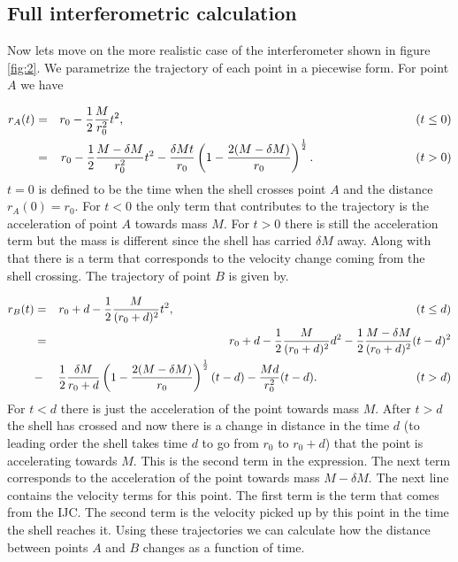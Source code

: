 \documentclass[aps,showpacs,onecolumn,floats,prd,superscriptaddress,nofootinbib]{revtex4-1}
\begin{document}
\subsection{Full interferometric calculation}

Now lets move on the more realistic case of the interferometer shown in figure \ref{fig:2}. We parametrize the trajectory of each point in a piecewise form. For point $A$ we have

\begin{eqnarray}
	r_A(t)  & = & r_0 - \frac{1}{2} \frac{M}{r_0^2} t^2, \hspace{85mm} (t \leq 0)	\nonumber	\\
	&  = & r_0 - \frac{1}{2} \frac{M-\delta M}{r_0^2} t^2 - \frac{\delta M t}{r_0} \left( 1 - \frac{2(M -\delta M)}{r_0} \right)^\frac{1}{2}. \hspace{30mm} (t>0)	\label{rA}
\end{eqnarray}
$t=0$ is defined to be the time when the shell crosses point $A$ and the distance $r_A(0) = r_0$. For $t<0$ the only term that contributes to the trajectory is the acceleration of point $A$ towards mass $M$. For $t>0$ there is still the acceleration term but the mass is different since the shell has carried $\delta M$ away. Along with that there is a term that corresponds to the velocity change coming from the shell crossing. The trajectory of point $B$ is given by.

\begin{eqnarray}
	r_B(t) & = & r_0 + d - \frac{1}{2}\frac{M}{(r_0+d)^2} t^2,  \hspace{73mm}	(t \leq d) \nonumber	\\
	& = & r_0 +d - \frac{1}{2} \frac{M}{(r_0 + d)^2}d^2 - \frac{1}{2} \frac{M - \delta M}{(r_0 +d)^2}(t - d)^2 \nonumber	\\
	& - & \frac{1}{2} \frac{\delta M}{r_0 + d}  \left( 1 - \frac{2(M -\delta M)}{r_0} \right)^\frac{1}{2} (t-d) - \frac{Md}{r_0^2}(t-d). \hspace{30mm} (t>d)	\label{rB}
\end{eqnarray}
For $t <d$ there is just the acceleration of the point towards mass $M$. After $t>d$ the shell has crossed and now there is a change in distance in the time $d$ (to leading order the shell takes time $d$ to go from $r_0$ to $r_0 + d$) that the point is accelerating towards $M$. This is the second term in the expression. The next term corresponds to the acceleration of the point towards mass $M-\delta M$. The next line contains the velocity terms for this point. The first term is the term that comes from the IJC. The second term is the velocity picked up by this point in the time the shell reaches it. Using these trajectories we can calculate how the distance between points $A$ and $B$ changes as a function of time. 
\end{document}

